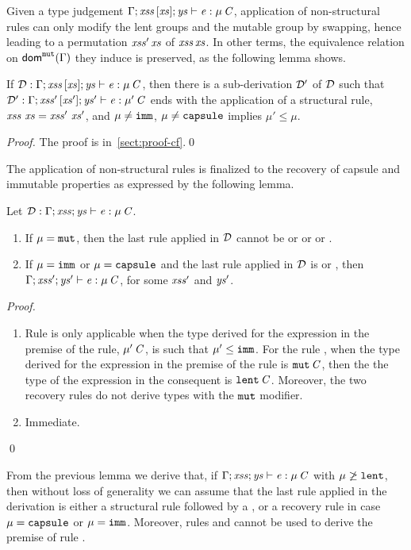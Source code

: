 {Given a type judgement $\Gamma;\mathit{xss}\,[\mathit{xs}];\mathit{ys}\vdash \mathit{e}:\mu\,\mathit{C}$,  {application of non-structural rules can only modify the lent groups and the mutable group by swapping, hence leading to a permutation $\mathit{xss}'\, \mathit{xs}$ of $\mathit{xss}\, \mathit{xs}$. In other terms,} the equivalence relation on $\textsf{dom}^{\texttt{mut}}(\Gamma)$
 {they induce} is preserved,
as the following lemma shows.
\begin{lemma} \label{lemma:nonStructural}
If ${\cal D}:\Gamma;\mathit{xss}\,[\mathit{xs}];\mathit{ys}\vdash \mathit{e}:\mu\,\mathit{C}$, then 
there is a sub-derivation ${\cal D}'$ of ${\cal D}$ such that ${\cal D}':\Gamma;\mathit{xss}'\,[\mathit{xs}'];\mathit{ys}'\vdash \mathit{e}:\mu'\,\mathit{C}$ ends with the application of a structural rule,  $\LentLocked\ \MutGroup=\LentLocked'\ \MutGroup'$, and $\mu\not=\texttt{imm}$, $\mu\not=\texttt{capsule}$ implies $\mu'\leq\mu$.
\end{lemma}
\begin{proof}
The proof is in~\ref{sect:proof-cf}.\qed
\end{proof}
The application of non-structural rules is finalized to the recovery of capsule and immutable properties
as expressed by the following lemma.
\begin{lemma}\label{lemma:typeStruct} 
Let ${\cal D}:\Gamma;\mathit{xss};\mathit{ys}\vdash {\mathit{e}}:\mu\,\mathit{C}$. 
\begin{enumerate}
  \item If $\mu=\texttt{mut}$, then the last rule applied in ${\cal D}$ cannot be  or  or  or  .
  \item If $\mu=\texttt{imm}$ or $\mu=\texttt{capsule}$ and the last rule applied in ${\cal D}$ is   or , then
  $\Gamma;\mathit{xss}';\mathit{ys}'\vdash {\mathit{e}}:\mu\,\mathit{C}$, for some $\mathit{xss}'$ and 
  $\mathit{ys}'$.
\end{enumerate}
\end{lemma}
\begin{proof}\
\begin{enumerate}
  \item Rule  is only applicable when the type derived for the expression in the premise of the rule, $\mu'\,\mathit{C}$, is such that $\mu'\leq \texttt{imm}$. For the rule , when the type derived for the expression in the premise of the rule is $\texttt{mut}\,\mathit{C}$, then the the type of the expression in the consequent is  $\texttt{lent}\,\mathit{C}$. Moreover, the two  {recovery} rules do not derive types with the $\texttt{mut}$ modifier.
  \item Immediate.
\end{enumerate}\qed
\end{proof}
From the previous lemma we derive that, if $\Gamma;\mathit{xss};\mathit{ys}\vdash {\mathit{e}}:\mu\,\mathit{C}$ with $\mu\not\geq\texttt{lent}$, then without loss of generality we can assume that the last rule applied in the derivation is either a structural rule followed by a , or a  {recovery rule} in case $\mu=\texttt{capsule}$ or $\mu=\texttt{imm}$. 
Moreover, rules \rn{t-swap} and \rn{t-unrst} cannot be used to derive the premise of rule \rn{t-capsule}.

}
